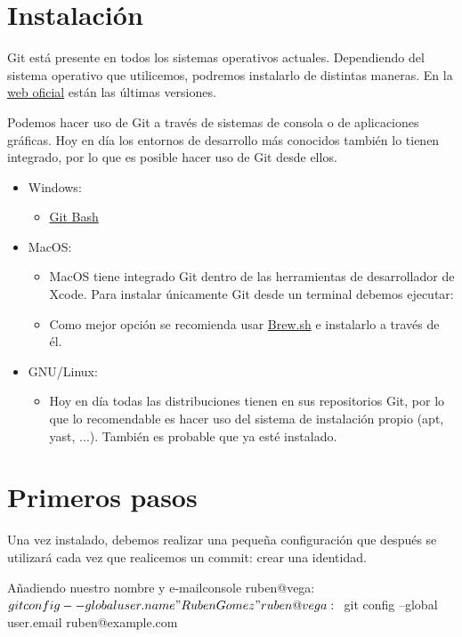 \chapter{Instalación}

Git está presente en todos los sistemas operativos actuales. Dependiendo del sistema operativo que utilicemos, podremos instalarlo de distintas maneras. En la  \href{https://git-scm.com/download/}{web oficial} están las últimas versiones.

Podemos hacer uso de Git a través de sistemas de consola o de aplicaciones gráficas. Hoy en día los entornos de desarrollo más conocidos también lo tienen integrado, por lo que es posible hacer uso de Git desde ellos.

\begin{itemize}
    \item Windows:
    \begin{itemize}
        \item \href{https://gitforwindows.org/}{Git Bash}
    \end{itemize}
    \item MacOS:
    \begin{itemize}
        \item MacOS tiene integrado Git dentro de las herramientas de desarrollador de Xcode. Para instalar únicamente Git desde un terminal debemos ejecutar:  
        \item Como mejor opción se recomienda usar \href{https://brew.sh/}{Brew.sh} e instalarlo a través de él.
    \end{itemize}
    \item GNU/Linux:
    \begin{itemize}
        \item Hoy en día todas las distribuciones tienen en sus repositorios Git, por lo que lo recomendable es hacer uso del sistema de instalación propio (apt, yast, ...). También es probable que ya esté instalado.
    \end{itemize}
\end{itemize}


\chapter{Primeros pasos}

Una vez instalado, debemos realizar una pequeña configuración que después se utilizará cada vez que realicemos un commit: crear una identidad.

\begin{mycode}{Añadiendo nuestro nombre y e-mail}{console}{}
ruben@vega:~$ git config --global user.name "Ruben Gomez"
ruben@vega:~$ git config --global user.email ruben@example.com
\end{mycode}

